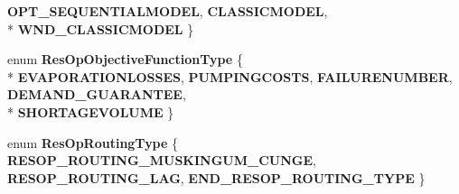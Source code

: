 \begin{DoxyCompactItemize}
{\bf O\+P\+T\+\_\+\+S\+E\+Q\+U\+E\+N\+T\+I\+A\+L\+M\+O\+D\+EL}, 
{\bf C\+L\+A\+S\+S\+I\+C\+M\+O\+D\+EL}, 
\\*
{\bf W\+N\+D\+\_\+\+C\+L\+A\+S\+S\+I\+C\+M\+O\+D\+EL}
 \}
\item 
enum {\bf Res\+Op\+Objective\+Function\+Type} \{ \\*
{\bf E\+V\+A\+P\+O\+R\+A\+T\+I\+O\+N\+L\+O\+S\+S\+ES}, 
{\bf P\+U\+M\+P\+I\+N\+G\+C\+O\+S\+TS}, 
{\bf F\+A\+I\+L\+U\+R\+E\+N\+U\+M\+B\+ER}, 
{\bf D\+E\+M\+A\+N\+D\+\_\+\+G\+U\+A\+R\+A\+N\+T\+EE}, 
\\*
{\bf S\+H\+O\+R\+T\+A\+G\+E\+V\+O\+L\+U\+ME}
 \}
\item 
enum {\bf Res\+Op\+Routing\+Type} \{ {\bf R\+E\+S\+O\+P\+\_\+\+R\+O\+U\+T\+I\+N\+G\+\_\+\+M\+U\+S\+K\+I\+N\+G\+U\+M\+\_\+\+C\+U\+N\+GE}, 
{\bf R\+E\+S\+O\+P\+\_\+\+R\+O\+U\+T\+I\+N\+G\+\_\+\+L\+AG}, 
{\bf E\+N\+D\+\_\+\+R\+E\+S\+O\+P\+\_\+\+R\+O\+U\+T\+I\+N\+G\+\_\+\+T\+Y\+PE}
 \}
\end{DoxyCompactItemize}
